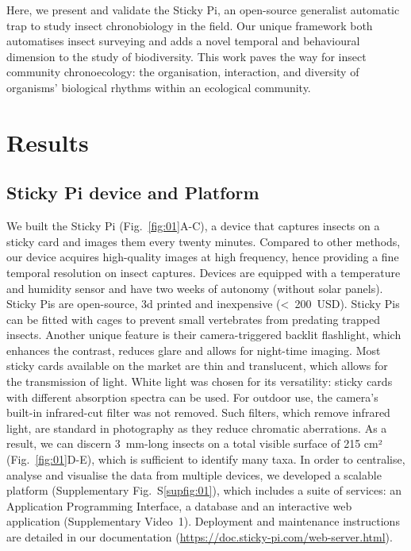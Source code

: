 \documentclass[12pt]{article}
\begin{document}
\begin{linenumbers}
		Here, we present and validate the Sticky Pi, an open-source generalist automatic trap to study insect chronobiology in the field. Our unique framework both automatises insect surveying and adds a novel temporal and behavioural dimension to the study of biodiversity. This work paves the way for insect community chronoecology: the organisation, interaction, and diversity of organisms’ biological rhythms within an ecological community. 

		
		
		\section*{Results}

		\subsection*{Sticky Pi device and Platform}

		We built the Sticky Pi (Fig.~\ref{fig:01}A-C), a device that captures insects on a sticky card and images them every twenty minutes. Compared to other methods, our device acquires high-quality images at high frequency, hence providing a fine temporal resolution on insect captures. Devices are equipped with a temperature and humidity sensor and have two weeks of autonomy (without solar panels). Sticky Pis are open-source, 3d printed and inexpensive (<~200~USD). 
		Sticky Pis can be fitted with cages to prevent small vertebrates from predating trapped insects.
		Another unique feature is their camera-triggered backlit flashlight, which enhances the contrast, reduces glare and allows for night-time imaging. Most sticky cards available on the market are thin and translucent, which allows for the transmission of light. 
		White light was chosen for its versatility: sticky cards with different absorption spectra can be used. 
        For outdoor use, the camera's built-in infrared-cut filter was not removed. 
        Such filters, which remove infrared light, are standard in photography as they reduce chromatic aberrations.
		As a result, we can discern 3~mm-long insects on a total visible surface of 215 cm² (Fig.~\ref{fig:01}D-E), which is sufficient to identify many taxa. In order to centralise, analyse and visualise the data from multiple devices, we developed a scalable platform (Supplementary Fig.~S\ref{supfig:01}), which includes a suite of services: an Application Programming Interface, a database and an interactive web application (Supplementary Video~1). Deployment and maintenance instructions are detailed in our documentation (\href{https://doc.sticky-pi.com/web-server.html}{https://doc.sticky-pi.com/web-server.html}).


\end{linenumbers}
\end{document}
